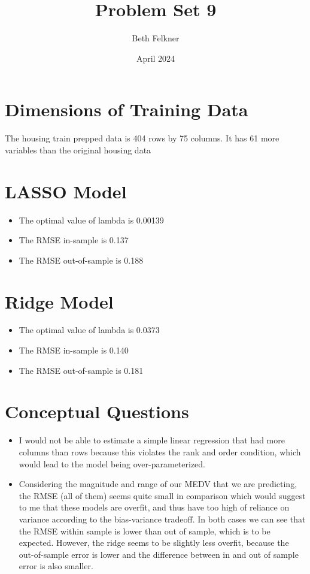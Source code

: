 \documentclass{article}
\title{Problem Set 9}
\author{Beth Felkner}
\date{April 2024}
\begin{document}
\maketitle
\section{Dimensions of Training Data}
The housing train prepped data is 404 rows by 75 columns. It has 61 more variables than the original housing data

\section{LASSO Model}
\begin{itemize}
   \item The optimal value of lambda is 0.00139
   \item The RMSE in-sample is 0.137
   \item The RMSE out-of-sample is 0.188
\end{itemize}

\section{Ridge Model}
\begin{itemize}
    \item The optimal value of lambda is 0.0373
    \item The RMSE in-sample is 0.140
    \item The RMSE out-of-sample is 0.181    
\end{itemize}

\section{Conceptual Questions}

\begin{itemize}
    \item I would not be able to estimate a simple linear regression  that had more columns than rows because this violates the rank and order condition, which would lead to the model being over-parameterized.
    \item Considering the magnitude and range of our MEDV that we are predicting, the RMSE (all of them) seems quite small in comparison which would suggest to me that these models are overfit, and thus have too high of reliance on variance according to the bias-variance tradeoff. In both cases we can see that the RMSE within sample is lower than out of sample, which is to be expected. However, the ridge seems to be slightly less overfit, because the out-of-sample error is lower and the difference between in and out of sample error is also smaller.
\end{itemize}
\end{document}
